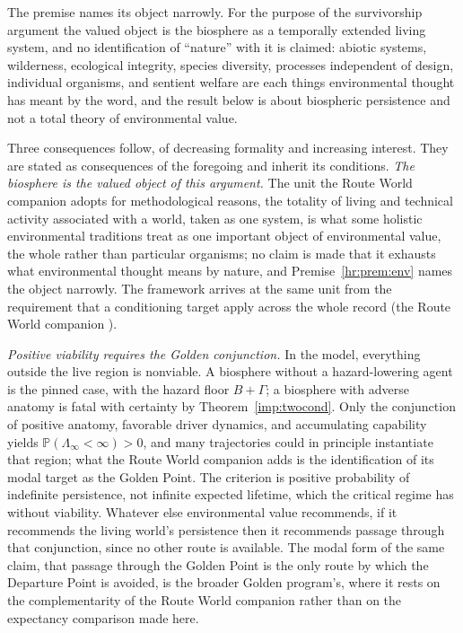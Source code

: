 \documentclass[11pt]{article}
\newcommand{\PP}{\mathbb{P}}
\theoremstyle{plain}
\theoremstyle{definition}
\theoremstyle{remark}
\begin{document}
\noindent The premise names its object narrowly. For the purpose of the
survivorship argument the valued object is the biosphere as a
temporally extended living system, and no identification of ``nature''
with it is claimed: abiotic systems, wilderness, ecological integrity,
species diversity, processes independent of design, individual
organisms, and sentient welfare are each things environmental thought
has meant by the word, and the result below is about biospheric
persistence and not a total theory of environmental value.

Three consequences follow, of decreasing formality and increasing
interest. They are stated as consequences of the foregoing and inherit
its conditions. \emph{The biosphere is the valued object of this argument.} The unit
the Route World companion \cite{RouteWorld} adopts for methodological reasons, the totality of
living and technical activity associated with a world, taken as one
system, is what some holistic environmental traditions treat as one
important object of environmental value, the whole rather than
particular organisms; no claim is made that it exhausts what
environmental thought means by nature, and Premise~\ref{hr:prem:env}
names the object narrowly. The framework arrives at the same unit from
the requirement that a conditioning target apply across the whole record
(the Route World companion \cite{RouteWorld}).

\emph{Positive viability requires the Golden conjunction.} In the model,
everything outside the live region is nonviable. A biosphere without a
hazard-lowering agent is the pinned case, with the hazard floor
$B+\Gamma$; a biosphere with adverse anatomy is fatal with certainty by
Theorem~\ref{imp:twocond}. Only the conjunction of positive anatomy,
favorable driver dynamics, and accumulating capability yields
$\PP(\Lambda_\infty<\infty)>0$, and many trajectories could in
principle instantiate that region; what the Route World companion adds
is the identification of its modal target as the Golden Point. The
criterion is positive probability of indefinite persistence, not
infinite expected lifetime, which the critical regime has without
viability. Whatever else environmental value
recommends, if it recommends the living world's persistence then it
recommends passage through that conjunction, since no other route is
available. The modal form of the same claim, that passage through the
Golden Point is the only route by which the Departure Point is avoided, is the broader Golden program's, where it rests on the complementarity of
the Route World companion \cite{RouteWorld} rather than on the expectancy comparison made
here.
\end{document}
